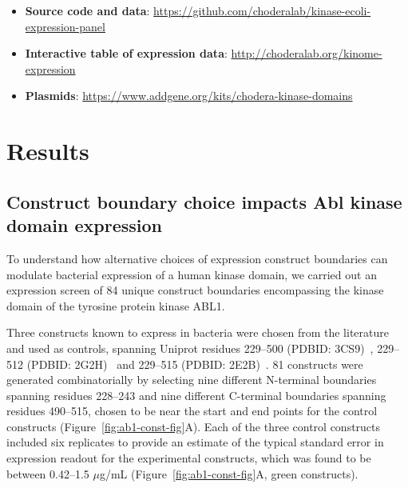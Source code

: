 \documentclass[phd,tocprelim]{cornell}
\begin{document}
\begin{itemize}
	\item {\bf Source code and data}: \url{https://github.com/choderalab/kinase-ecoli-expression-panel}
	\item {\bf Interactive table of expression data}: \url{http://choderalab.org/kinome-expression}
	\item {\bf Plasmids}: \url{https://www.addgene.org/kits/chodera-kinase-domains}
\end{itemize}

\section{Results}
\subsection{Construct boundary choice impacts Abl kinase domain expression} 

To understand how alternative choices of expression construct boundaries can modulate bacterial expression of a human kinase domain, we carried out an expression screen of 84 unique construct boundaries encompassing the kinase domain of the tyrosine protein kinase ABL1. 

Three constructs known to express in bacteria were chosen from the literature and used as controls, spanning Uniprot residues 229--500 (PDBID: 3CS9)~\citep{Weisberg:2005boa}, 229--512 (PDBID: 2G2H)~\citep{levinson:plos-biology:2006:inactive-abl} and 229--515 (PDBID: 2E2B)~\citep{Horio:2007wo}. 
81 constructs were generated combinatorially by selecting nine different N-terminal boundaries spanning residues 228--243 and nine different C-terminal boundaries spanning residues 490--515, chosen to be near the start and end points for the control constructs (Figure~\ref{fig:ab1-const-fig}A). 
Each of the three control constructs included six replicates to provide an estimate of the typical standard error in expression readout for the experimental constructs, which was found to be between 0.42--1.5 $\mu$g/mL (Figure~\ref{fig:ab1-const-fig}A, green constructs). 
\end{document}
